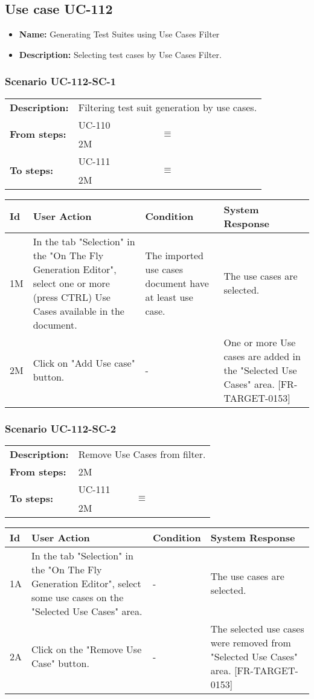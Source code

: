 \documentclass[a4paper,11pt]{article}
\newcommand{\bl}{\\ \hline}
\begin{document}
\subsection*{Use case UC-112}
\begin{itemize}
\item {\bf Name: }Generating Test Suites using Use Cases Filter
\item {\bf Description: }Selecting test cases by Use Cases Filter.
\end{itemize}
\subsubsection*{Scenario UC-112-SC-1}
\begin{tabular}{p{1in}p{4in}}
{\bf Description:} & Filtering test suit generation by use cases. \\
{\bf From steps:} & UC-110$$\equiv$$2M \\
{\bf To steps:} & UC-111$$\equiv$$2M \\
\end{tabular}
 
\begin{tabular}{|p{0.8in}|p{1.6in}|p{1.6in}|p{1.6in}|}
\hline
Id & User Action & Condition & System Response  \bl 
1M & In the tab "Selection" in the "On The Fly Generation Editor", select one or more (press CTRL) Use Cases available in the document. & The imported use cases document have at least use case. & The use cases are selected. \bl 
2M & Click on "Add Use case" button. & - & One or more Use cases are added in the "Selected Use Cases" area. [FR-TARGET-0153] \bl 
\end{tabular}
\subsubsection*{Scenario UC-112-SC-2}
\begin{tabular}{p{1in}p{4in}}
{\bf Description:} & Remove Use Cases from filter. \\
{\bf From steps:} & 2M \\
{\bf To steps:} & UC-111$$\equiv$$2M \\
\end{tabular}
 
\begin{tabular}{|p{0.8in}|p{1.6in}|p{1.6in}|p{1.6in}|}
\hline
Id & User Action & Condition & System Response  \bl 
1A & In the tab "Selection" in the "On The Fly Generation Editor", select some use cases on the "Selected Use Cases" area. & - & The use cases are selected. \bl 
2A & Click on the "Remove Use Case" button. & - & The selected use cases were removed from "Selected Use Cases" area. [FR-TARGET-0153] \bl 
\end{tabular}
\end{document}
